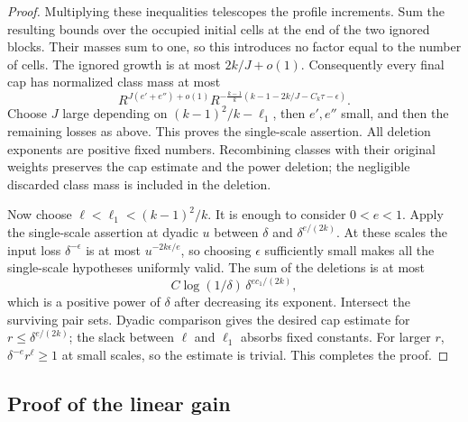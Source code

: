 \begin{proof}
Multiplying these inequalities telescopes the profile increments.
Sum the resulting bounds over the occupied initial cells at the end of
the two ignored blocks. Their masses sum to one, so this introduces no
factor equal to the number of cells. The ignored growth is at most
$2k/J+o(1)$. Consequently every final cap has normalized class mass at most
\[
 R^{J(e'+e'')+o(1)}
 R^{-\frac{k-1}{k}(k-1-2k/J-C_k\tau-\epsilon)}.
\]
Choose $J$ large depending on $(k-1)^2/k-\ell_1$, then $e',e''$
small, and then the remaining losses as above. This proves the
single-scale assertion. All deletion exponents are positive fixed
numbers. Recombining classes with their original weights preserves
the cap estimate and the power deletion; the negligible discarded
class mass is included in the deletion.

Now choose $\ell<\ell_1<(k-1)^2/k$. It is enough to consider
$0<e<1$. Apply the single-scale assertion at dyadic $u$ between
$\delta$ and $\delta^{e/(2k)}$. At these scales the input loss
$\delta^{-\epsilon}$ is at most $u^{-2k\epsilon/e}$, so choosing
$\epsilon$ sufficiently small makes all the single-scale hypotheses
uniformly valid. The sum of the deletions is at most
\[
 C\log(1/\delta)\,\delta^{ec_1/(2k)},
\]
which is a positive power of $\delta$ after decreasing its exponent.
Intersect the surviving pair sets. Dyadic comparison gives the desired
cap estimate for $r\le\delta^{e/(2k)}$; the slack between $\ell$
and $\ell_1$ absorbs fixed constants. For larger $r$,
$\delta^{-e}r^\ell\ge1$ at small scales, so the estimate is trivial.
This completes the proof.
\end{proof}

\subsection{Proof of the linear gain}

